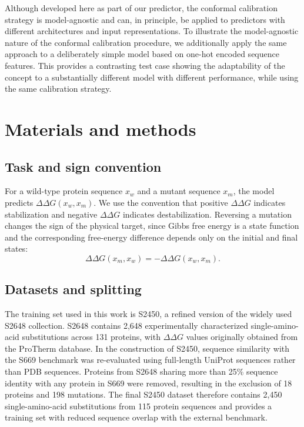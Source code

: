 \documentclass[11pt]{article}
\newcommand{\ddg}{\Delta\Delta G}
\begin{document}
Although developed here as part of our predictor, the conformal calibration strategy is model-agnostic and can, in principle, be applied to predictors with different architectures and input representations. To illustrate the model-agnostic nature of the conformal calibration procedure, we additionally apply the same approach to a deliberately simple model based on one-hot encoded sequence features. This provides a contrasting test case showing the adaptability of the concept to a substantially different model with different performance, while using the same calibration strategy.


\section{Materials and methods}

\subsection{Task and sign convention}

For a wild-type protein sequence $x_w$ and a mutant sequence $x_m$, the model predicts
$\ddg(x_w,x_m)$. We use the convention that positive $\ddg$ indicates stabilization and negative
$\ddg$ indicates destabilization\cite{capriotti2004neural}. Reversing a mutation changes the sign of the physical target, since Gibbs free energy is a state function and the corresponding free-energy difference depends only on the initial and final states:
\begin{equation}
\ddg(x_m,x_w)=-\ddg(x_w,x_m).
\end{equation}

\subsection{Datasets and splitting}
The training set used in this work is S2450, a refined version of the widely used S2648 collection\cite{savojardo2025ddgemb}. S2648 contains 2,648 experimentally characterized single-amino-acid substitutions across 131 proteins, with \(\Delta\Delta G\) values originally obtained from the ProTherm database\cite{dehouck2011popmusic}. In the construction of S2450, sequence similarity with the S669 benchmark was re-evaluated using full-length UniProt sequences rather than PDB sequences. Proteins from S2648 sharing more than 25\% sequence identity with any protein in S669 were removed, resulting in the exclusion of 18 proteins and 198 mutations. The final S2450 dataset therefore contains 2,450 single-amino-acid substitutions from 115 protein sequences and provides a training set with reduced sequence overlap with the external benchmark.
\end{document}
